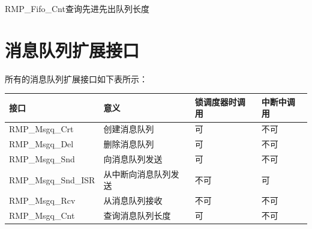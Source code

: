 \begin{apidesc}{RMP\_Fifo\_Cnt}{查询先进先出队列长度}
    \begin{apiparams}
    \end{apiparams}
    \begin{apiret}
    \end{apiret}
\end{apidesc}

\section{消息队列扩展接口}\label{sec:message-queue-extension-interface}

所有的消息队列扩展接口如下表所示：

\label{tab:message-queue-extension-interface-summary}

{\def\LTcaptype{none} %
\begin{longtable}[]{@{}
  >{\raggedright\arraybackslash}p{}
  >{\raggedright\arraybackslash}p{}
  >{\raggedright\arraybackslash}p{}
  >{\raggedright\arraybackslash}p{}@{}}
\toprule\noalign{}
\begin{minipage}[b]{\linewidth}\raggedright
接口
\end{minipage} & \begin{minipage}[b]{\linewidth}\raggedright
意义
\end{minipage} & \begin{minipage}[b]{\linewidth}\raggedright
锁调度器时调用
\end{minipage} & \begin{minipage}[b]{\linewidth}\raggedright
中断中调用
\end{minipage} \\
\midrule\noalign{}
\endhead
\bottomrule\noalign{}
\endlastfoot
RMP\_Msgq\_Crt & 创建消息队列 & 可 & 不可 \\
RMP\_Msgq\_Del & 删除消息队列 & 可 & 不可 \\
RMP\_Msgq\_Snd & 向消息队列发送 & 可 & 不可 \\
RMP\_Msgq\_Snd\_ISR & 从中断向消息队列发送 & 不可 & 可 \\
RMP\_Msgq\_Rcv & 从消息队列接收 & 不可 & 不可 \\
RMP\_Msgq\_Cnt & 查询消息队列长度 & 可 & 不可 \\
\end{longtable}
}

